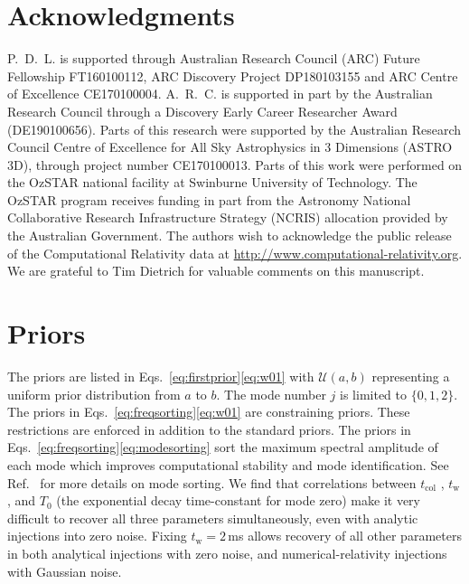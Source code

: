 \documentclass[
reprint,
prd,
twocolumn,
nofootinbib,
 amsmath,
showpacs ,amssymb, aps,%
superscriptaddress
]{revtex4-1}
\newcommand{\tc}{t_{\mathrm{col}}}
\newcommand{\tw}{t_{\mathrm{w}}}
\begin{document}
\section{Acknowledgments}
        P.~D.~L. is supported through Australian Research Council (ARC) Future Fellowship FT160100112,  ARC Discovery Project DP180103155 and  ARC Centre of Excellence CE170100004. A.~R.~C. is supported in part by the Australian Research Council through a Discovery Early Career Researcher Award (DE190100656). Parts of this research were supported by the Australian Research Council Centre of Excellence for All Sky Astrophysics in 3 Dimensions (ASTRO 3D), through project number CE170100013. Parts of this work were performed on the OzSTAR national facility at Swinburne University of Technology. The OzSTAR program receives funding in part from the Astronomy National Collaborative Research Infrastructure Strategy (NCRIS) allocation provided by the Australian Government. The authors wish to acknowledge the public release of the Computational Relativity data at \url{http://www.computational-relativity.org}. We are grateful to Tim Dietrich for valuable comments on this manuscript.
\balance


\appendix

\renewcommand\thetable{\thesection.\arabic{table}} 
\setcounter{table}{0} 


\section{Priors}
\label{appendix:a}
    The priors are listed in Eqs.~\ref{eq:firstprior}\Hyphdash*\ref{eq:w01} with $\mathcal{U}(a,b)$ representing a uniform prior distribution from $a$ to $b$. 
    The mode number $j$ is limited to $\lbrace 0,1,2 \rbrace$. 
    The priors in Eqs.~\ref{eq:freqsorting}\Hyphdash*\ref{eq:w01} are constraining priors. 
    These restrictions are enforced in addition to the standard priors. 
    The priors in Eqs.~\ref{eq:freqsorting}\Hyphdash*\ref{eq:modesorting} sort the maximum spectral amplitude of each mode which improves computational stability and mode identification.
    See Ref.~\cite{Easter2020} for more details on mode sorting.
    We find that correlations between $\tc$ , $\tw$, and $T_0$ (the exponential decay time-constant for mode zero) make it very difficult to recover all three parameters simultaneously, even with analytic injections into zero noise.
    Fixing $\tw=2$\,ms allows recovery of all other parameters in both analytical injections with zero noise, and numerical-relativity injections with Gaussian noise.
    \vfill\null 
    
\end{document}
